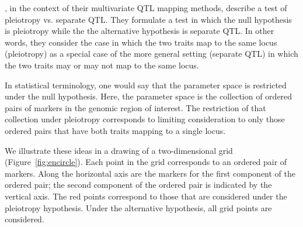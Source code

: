 \documentclass[]{article}\usepackage[]{graphicx}\usepackage[]{color}
\makeatletter
\newenvironment{kframe}{%
 \def\at@end@of@kframe{}%
 \ifinner\ifhmode%
  \def\at@end@of@kframe{\end{minipage}}%
  \begin{minipage}{\columnwidth}%
 \fi\fi%
 \def\FrameCommand##1{\hskip\@totalleftmargin \hskip-\fboxsep
 \colorbox{shadecolor}{##1}\hskip-\fboxsep
     \hskip-\linewidth \hskip-\@totalleftmargin \hskip\columnwidth}%
 \MakeFramed {\advance\hsize-\width
   \@totalleftmargin\z@ \linewidth\hsize
   \@setminipage}}%
 {\par\unskip\endMakeFramed%
 \at@end@of@kframe}
\newenvironment{knitrout}{}{} %
\makeatother
\begin{document}
\citet{jiang1995multiple}, in the context of their multivariate QTL mapping methods, 
describe a test of pleiotropy vs. separate QTL. 
They formulate a test in which the null hypothesis
is pleiotropy while the the alternative hypothesis is separate QTL.
In other words, they consider the case in which the two traits map to the same locus
(pleiotropy) as a special case of the more general setting (separate QTL)
in which the two traits may or may not map to the same locus.

In statistical terminology, one would say that the parameter space is restricted under the null hypothesis. Here, the parameter space is the collection of ordered pairs of markers in the genomic region of interest. The restriction of that collection under pleiotropy corresponds to limiting consideration to only those ordered pairs that have both traits mapping to a single locus. 

We illustrate these ideas in a drawing of a two-dimensional grid (Figure~\ref{fig:encircle}). Each point in the grid corresponds to an ordered pair of markers. Along the horizontal axis are the markers for the first component of the ordered pair; the second component of the ordered pair is indicated by the vertical axis. The red points correspond to those that are considered under the pleiotropy hypothesis. Under the alternative hypothesis, all grid points are considered. 


\begin{knitrout}
\color{fgcolor}\begin{kframe}


{\ttfamily\noindent\itshape\color{messagecolor}{\#\# -- Attaching packages ------------------------------------------ tidyverse 1.2.1 --}}

{\ttfamily\noindent\itshape\color{messagecolor}{\#\# v ggplot2 3.1.0\ \ \ \ \ \  v purrr\ \  0.3.1\ \ \\\#\# v tibble\ \ 2.0.1\ \ \ \ \ \  v dplyr\ \  0.8.0.1\\\#\# v tidyr\ \  0.8.3\ \ \ \ \ \  v stringr 1.4.0\ \ \\\#\# v readr\ \  1.3.1\ \ \ \ \ \  v forcats 0.4.0}}

{\ttfamily\noindent\itshape\color{messagecolor}{\#\# -- Conflicts --------------------------------------------- tidyverse\_conflicts() --\\\#\# x .GlobalEnv::cross() masks purrr::cross()\\\#\# x dplyr::filter()\ \ \ \  masks stats::filter()\\\#\# x dplyr::lag()\ \ \ \ \ \ \ \ masks stats::lag()}}\end{kframe}
\end{knitrout}
\end{document}
